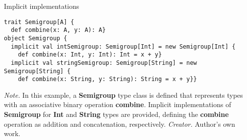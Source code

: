 \begin{table}[h!]
\caption{Implicit implementations}
\begin{lstlisting}
trait Semigroup[A] {
  def combine(x: A, y: A): A}
object Semigroup {
  implicit val intSemigroup: Semigroup[Int] = new Semigroup[Int] {
    def combine(x: Int, y: Int): Int = x + y}
  implicit val stringSemigroup: Semigroup[String] = new Semigroup[String] {
    def combine(x: String, y: String): String = x + y}}
\end{lstlisting}
\small
\textit{Note.} In this example, a \textbf{Semigroup} type class is defined that represents types with an associative binary operation \textbf{combine}. Implicit implementations of \textbf{Semigroup} for \textbf{Int} and \textbf{String} types are provided, defining the \textbf{combine} operation as addition and concatenation, respectively.
\textit{Creator.} Author's own work.
\end{table}